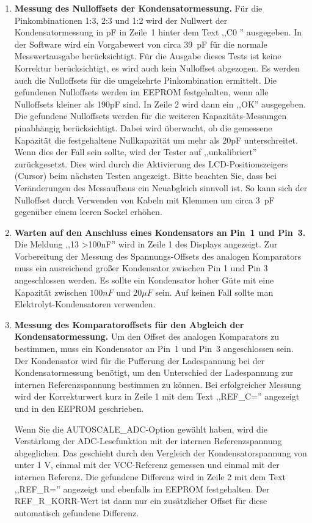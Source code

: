 \begin{enumerate}
\item {\bf Messung des Nulloffsets der Kondensatormessung.}
Für die Pinkombinationen 1:3, 2:3 und 1:2 wird der Nullwert der Kondensatormessung in pF in Zeile~1
hinter dem Text ,,C0 '' ausgegeben.
In der Software wird ein Vorgabewert von circa 39~pF für die normale Messwertausgabe berücksichtigt.
Für die Ausgabe dieses Tests ist keine Korrektur berücksichtigt, es wird auch kein Nulloffset abgezogen.
Es werden auch die Nulloffsets für die umgekehrte Pinkombination ermittelt.
Die gefundenen Nulloffsets werden im EEPROM festgehalten, wenn alle Nulloffsets kleiner als 190pF sind.
In Zeile 2 wird dann ein ,,OK'' ausgegeben.
Die gefundene Nulloffsets werden für die weiteren Kapazitäts-Messungen pinabhängig berücksichtigt.
Dabei wird überwacht, ob die gemessene Kapazität die festgehaltene Nullkapazität um mehr als 20pF unterschreitet.
Wenn dies der Fall sein sollte, wird der Tester auf ,,unkalibriert'' zurückgesetzt.
Dies wird durch die Aktivierung des LCD-Positionszeigers (Cursor) beim nächsten Testen angezeigt.
Bitte beachten Sie, dass bei Veränderungen des Messaufbaus ein Neuabgleich sinnvoll ist.
So kann sich der Nulloffset durch Verwenden von Kabeln mit Klemmen um circa 3~pF gegenüber einem leeren
Sockel erhöhen.

\item {\bf Warten auf den Anschluss eines Kondensators an Pin~1 und Pin~3.}
Die Meldung ,,1\mbox{\electricC}3 \textgreater 100nF'' wird in Zeile 1 des Displays angezeigt.
Zur Vorbereitung der Messung des Spannungs-Offsets des analogen Komparators muss ein ausreichend großer
Kondensator zwischen Pin 1 und Pin 3 angeschlossen werden.
Es sollte ein Kondensator hoher Güte mit eine Kapazität zwischen \(100 nF\) und \(20 \mu F\) sein. 
Auf keinen Fall sollte man Elektrolyt-Kondensatoren verwenden.


\item {\bf Messung des Komparatoroffsets für den Abgleich der Kondensatormessung.}
Um den Offset des analogen Komparators zu bestimmen, muss ein Kondensator an Pin~1 und Pin~3 angeschlossen sein.
Der Kondensator wird für die Pufferung der Ladespannung bei der Kondensatormessung benötigt, um den Unterschied der 
Ladespannung zur internen Referenzspannung bestimmen zu können.
Bei erfolgreicher Messung wird der Korrekturwert kurz in Zeile 1 mit dem Text ,,REF\_C='' angezeigt und in den EEPROM geschrieben.

Wenn Sie die AUTOSCALE\_ADC-Option gewählt haben, wird die Verstärkung der ADC-Lesefunktion mit der
internen Referenzspannung abgeglichen. Das geschieht durch den Vergleich der Kondensatorspannung von unter 1 V, einmal mit
der VCC-Referenz gemessen und einmal mit der internen Referenz.
Die gefundene Differenz wird in Zeile 2 mit dem Text ,,REF\_R='' angezeigt und ebenfalls im EEPROM festgehalten.
Der REF\_R\_KORR-Wert ist dann nur ein zusätzlicher Offset für diese automatisch gefundene Differenz.

\end{enumerate}

